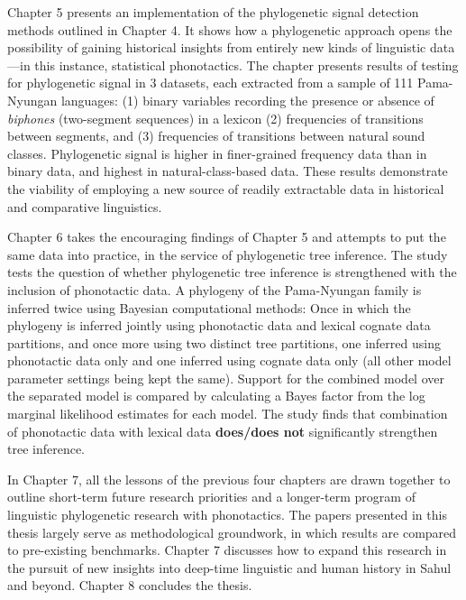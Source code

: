 Chapter 5 presents an implementation of the phylogenetic signal detection methods outlined in Chapter 4. It shows how a phylogenetic approach opens the possibility of gaining historical insights from entirely new kinds of linguistic data---in this instance, statistical phonotactics. The chapter presents results of testing for phylogenetic signal in 3 datasets, each extracted from a sample of 111 Pama-Nyungan languages: (1) binary variables recording the presence or absence of \emph{biphones} (two-segment sequences) in a lexicon (2) frequencies of transitions between segments, and (3) frequencies of transitions between natural sound classes. Phylogenetic signal is higher in finer-grained frequency data than in binary data, and highest in natural-class-based data. These results demonstrate the viability of employing a new source of readily extractable data in historical and comparative linguistics.

Chapter 6 takes the encouraging findings of Chapter 5 and attempts to put the same data into practice, in the service of phylogenetic tree inference. The study tests the question of whether phylogenetic tree inference is strengthened with the inclusion of phonotactic data. A phylogeny of the Pama-Nyungan family is inferred twice using Bayesian computational methods: Once in which the phylogeny is inferred jointly using phonotactic data and lexical cognate data partitions, and once more using two distinct tree partitions, one inferred using phonotactic data only and one inferred using cognate data only (all other model parameter settings being kept the same). Support for the combined model over the separated model is compared by calculating a Bayes factor from the log marginal likelihood estimates for each model. The study finds that combination of phonotactic data with lexical data \textbf{does/does not} significantly strengthen tree inference.

In Chapter 7, all the lessons of the previous four chapters are drawn together to outline short-term future research priorities and a longer-term program of linguistic phylogenetic research with phonotactics. The papers presented in this thesis largely serve as methodological groundwork, in which results are compared to pre-existing benchmarks. Chapter 7 discusses how to expand this research in the pursuit of new insights into deep-time linguistic and human history in Sahul and beyond. Chapter 8 concludes the thesis.


